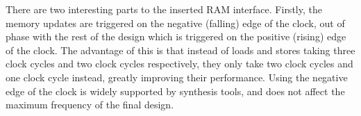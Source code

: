 
There are two interesting parts to the inserted RAM interface.  Firstly, the memory updates are triggered on the negative (falling) edge of the clock, out of phase with the rest of the design which is triggered on the positive (rising) edge of the clock.  The advantage of this is that instead of loads and stores taking three clock cycles and two clock cycles respectively, they only take two clock cycles and one clock cycle instead, greatly improving their performance. %
Using the negative edge of the clock is widely supported by synthesis tools, and does not affect the maximum frequency of the final design.

